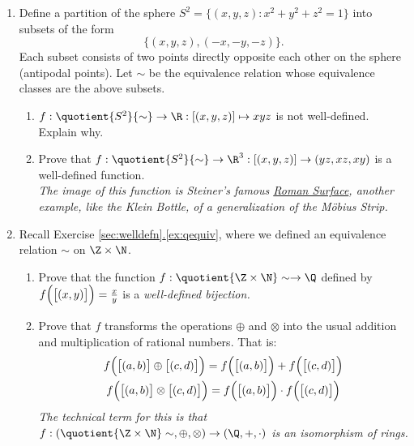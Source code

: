 \begin{enumerate}
	\item Define a partition of the sphere $S^2=\bigl\{(x,y,z):x^2+y^2+z^2=1\bigr\}$ into subsets of the form
	\[\bigl\{(x,y,z),(-x,-y,-z)\bigr\}.\]
	Each subset consists of two points directly opposite each other on the sphere (antipodal points). Let $\sim$ be the equivalence relation whose equivalence classes are the above subsets.
		\begin{enumerate}
	  	\item $f:\quotient{S^2}{\sim}\to\R:[(x,y,z)]\mapsto xyz$ is not well-defined. Explain why.
	  	\item Prove that $f:\quotient{S^2}{\sim}\to\R^3:[(x,y,z)]\to(yz,xz,xy)$ is a well-defined function.\\
			\emph{The image of this function is Steiner's famous \href{http://en.wikipedia.org/wiki/Roman_surface}{Roman Surface}, another example, like the Klein Bottle, of a generalization of the M\"obius Strip.}
		\end{enumerate}
		
		\item Recall Exercise \hyperref[ex:qequiv]{\ref*{sec:welldefn}.\ref*{ex:qequiv}}, where we defined an equivalence relation $\sim$ on $\Z\times\N$.
		\begin{enumerate}
			\item	Prove that the function $f:\quotient{\Z\times\N}\sim\to\Q$ defined by $f\Bigl(\bigl[(x,y)\bigr]\Bigr)=\frac xy$ is a \emph{well-defined bijection.}
			\item Prove that $f$ transforms the operations $\oplus$ and $\otimes$ into the usual addition and multiplication of rational numbers. That is:
			\begin{gather*}
			f\Bigl(\bigl[(a,b)\bigr]\oplus\bigl[(c,d)\bigr]\Bigr)=f\Bigl(\bigl[(a,b)\bigr]\Bigr)+f\Bigl(\bigl[(c,d)\bigr]\Bigr)\\
			f\Bigl(\bigl[(a,b)\bigr]\otimes\bigl[(c,d)\bigr]\Bigr)=f\Bigl(\bigl[(a,b)\bigr]\Bigr)\cdot f\Bigl(\bigl[(c,d)\bigr]\Bigr)
			\end{gather*}
			\emph{The technical term for this is that $f:\left(\quotient{\Z\times\N}\sim,\oplus,\otimes\right)\to(\Q,+,\cdot)$ is an isomorphism of rings.}
		\end{enumerate}
\end{enumerate}

\fi
